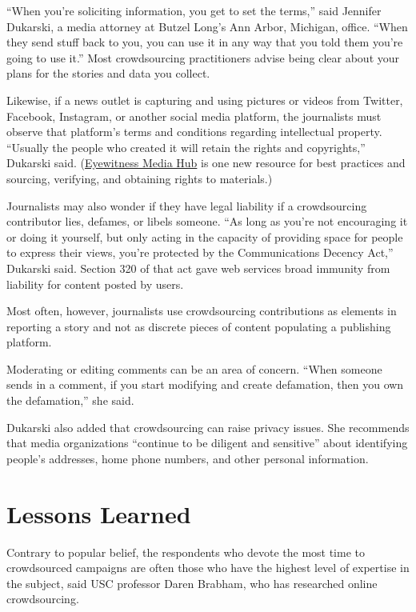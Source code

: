 \begin{itemize}
\begin{itemize}
``When you’re soliciting information, you get to set the terms,'' said Jennifer Dukarski, a media attorney at Butzel Long’s Ann Arbor, Michigan, office. ``When they send stuff back to you, you can use it in any way that you told them you’re going to use it.''\autocite{Dukarski} Most crowdsourcing practitioners advise being clear about your plans for the stories and data you collect.

Likewise, if a news outlet is capturing and using pictures or videos from Twitter, Facebook, Instagram, or another social media platform, the journalists must observe that platform’s terms and conditions regarding intellectual property. ``Usually the people who created it will retain the rights and copyrights,'' Dukarski said. (\href{http://eyewitnessmediahub.com/%5D}{Eyewitness Media Hub} is one new resource for best practices and sourcing, verifying, and obtaining rights to materials.)\autocite{EyewitnessMediaHub}

Journalists may also wonder if they have legal liability if a crowdsourcing contributor lies, defames, or libels someone. ``As long as you’re not encouraging it or doing it yourself, but only acting in the capacity of providing space for people to express their views, you’re protected by the Communications Decency Act,'' Dukarski said. Section 320 of that act gave web services broad immunity from liability for content posted by users. 

Most often, however, journalists use crowdsourcing contributions as elements in reporting a story and not as discrete pieces of content populating a publishing platform.

Moderating or editing comments can be an area of concern. ``When someone sends in a comment, if you start modifying and create defamation, then you own the defamation,'' she said.

Dukarski also added that crowdsourcing can raise privacy issues. She recommends that media organizations ``continue to be diligent and sensitive'' about identifying people’s addresses, home phone numbers, and other personal information. 


\chapter{Lessons Learned} 

Contrary to popular belief, the respondents who devote the most time to crowdsourced campaigns are often those who have the highest level of expertise in the subject, said USC professor Daren Brabham, who has researched online crowdsourcing. 


\end{itemize}
\end{itemize}

